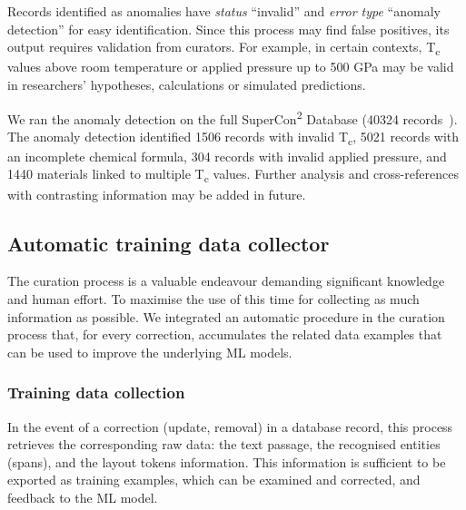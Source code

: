 Records identified as anomalies have \emph{status} ``invalid'' and \emph{error type} ``anomaly detection'' for easy identification.
Since this process may find false positives, its output requires validation from curators. 
For example, in certain contexts, T\textsubscript{c} values above room temperature or applied pressure up to 500 GPa may be valid in researchers' hypotheses, calculations or simulated predictions. 

We ran the anomaly detection on the full SuperCon\textsuperscript{2} Database (40324 records~\cite{foppiano2023automatic}). 
The anomaly detection identified 1506 records with invalid T\textsubscript{c}, 5021 records with an incomplete chemical formula, 304 records with invalid applied pressure, and 1440 materials linked to multiple T\textsubscript{c} values. 
Further analysis and cross-references with contrasting information may be added in future. 

\subsection{Automatic training data collector}
\label{subsec:feedback-loop-training-data}
The curation process is a valuable endeavour demanding significant knowledge and human effort. 
To maximise the use of this time for collecting as much information as possible.
We integrated an automatic procedure in the curation process that, for every correction, accumulates the related data examples that can be used to improve the underlying ML models. 

\subsubsection{Training data collection}
In the event of a correction (update, removal) in a database record, this process retrieves the corresponding raw data: the text passage, the recognised entities (spans), and the layout tokens information. 
This information is sufficient to be exported as training examples, which can be examined and corrected, and feedback to the ML model. 

